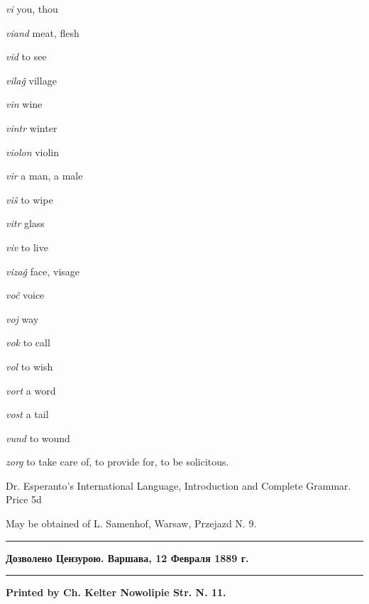 \begin{landscape}
\begin{multicols}{5}
\begin{outdent}{1em}
\emph{vi } you, thou

\emph{viand}  meat, flesh

\emph{vid } to see

\emph{vilaĝ } village

\emph{vin}  wine

\emph{vintr}  winter

\emph{violon}  violin

\emph{vir } a man,  a male

\emph{viŝ } to wipe

\emph{vitr } glass

\emph{viv}  to live

\emph{vizaĝ}  face, visage

\emph{voĉ } voice

\emph{voj } way

\emph{vok}  to call

\emph{vol}  to wish

\emph{vort}  a word

\emph{vost}  a tail

\emph{vund } to wound
\end{outdent}


\begin{outdent}{1em}
\emph{zorg}  to take care of, to provide for, to be solicitous.
\end{outdent}

\end{multicols}

\begin{center}
{\leftpointright \hspace{1em} Dr. Esperanto's International Language, Introduction and Complete Grammar. Price 5d\hspace{1em}\rightpointleft}

{\small May be obtained of L. Samenhof, Warsaw, Przejazd N. 9.}

\begin{minipage}[t]{7cm}
\rule{7cm}{0.4pt}
\bf\scriptsize Дозволено Цензурою. Варшава, 12 Февраля 1889 г. 
\end{minipage}
\begin{minipage}[t]{4cm}
\hspace{4cm}
\end{minipage}
\begin{minipage}[t]{7cm}
\begin{flushright}
\rule{7cm}{0.4pt}
\bf\scriptsize Printed by Ch. Kelter Nowolipie Str. N. 11.
\end{flushright}
\end{minipage}
\end{center}
\end{landscape}
\restoregeometry
\setlength{\parindent}{\tempparindent}
